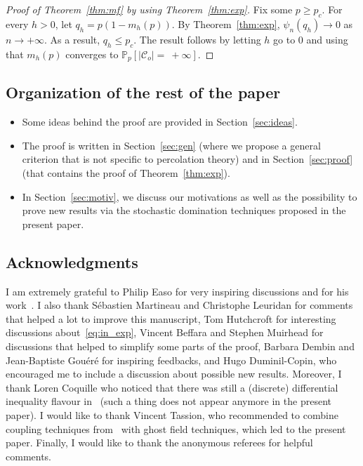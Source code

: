 \documentclass[10pt]{amsart}
\theoremstyle{definition}\newtheorem{defi}[theo]{Definition}\newtheorem{rema}[theo]{Remark}\newtheorem{exam}[theo]{Example}\newtheorem{exem}[theo]{Example}\newtheorem{nota}[theo]{Notation}
\newcommand{\Pro}{\mathbb{P}}
\newcommand{\calC}{\mathcal{C}}
\begin{document}
\begin{proof}[Proof of Theorem~\ref{thm:mf} by using Theorem~\ref{thm:exp}]
Fix some $p\ge p_c$. For every $h>0$, let $q_h=p(1-m_h(p))$. By Theorem~\ref{thm:exp}, $\psi_n(q_h)\rightarrow 0$ as $n\rightarrow+\infty$. As a result, $q_h\le p_c$. The result follows by letting $h$ go to $0$ and using that $m_h(p)$ converges to $\Pro_p[|\calC_o|=~+\infty]$.
\end{proof}



\subsection*{Organization of the rest of the paper}
\begin{itemize}
\item Some ideas behind the proof are provided in Section~\ref{sec:ideas}.
\item The proof is written in Section~\ref{sec:gen} (where we propose a general criterion that is not specific to percolation theory) and in Section~\ref{sec:proof} (that contains the proof of Theorem~\ref{thm:exp}).
\item In Section~\ref{sec:motiv}, we discuss our motivations as well as the possibility to prove new results via the stochastic domination techniques proposed in the present paper.
\end{itemize}

\subsection*{Acknowledgments}
I am extremely grateful to Philip Easo for very inspiring discussions and for his work~\cite{Eas22}. I also thank Sébastien Martineau and Christophe Leuridan for comments that helped a lot to improve this manuscript, Tom Hutchcroft for interesting discussions about~\eqref{eq:in_exp}, Vincent Beffara and Stephen Muirhead for discussions that helped to simplify some parts of the proof, Barbara Dembin and Jean-Baptiste Gouéré for inspiring feedbacks, and Hugo Duminil-Copin, who encouraged me to include a discussion about possible new results. Moreover, I thank Loren Coquille who noticed that there was still a (discrete) differential inequality flavour in~\cite{Van22} (such a thing does not appear anymore in the present paper). I would like to thank Vincent Tassion, who recommended to combine coupling techniques from~\cite{Eas22,Van22} with ghost field techniques, which led to the present paper. Finally, I would like to thank the anonymous referees for helpful comments.
\end{document}
